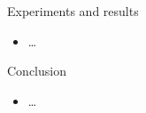\documentclass[t,11pt]{beamer}
\begin{document}
\begin{frame}[fragile]{Experiments and results}
\begin{itemize}
  \item \ldots
\end{itemize}
\end{frame}

\begin{frame}[fragile]{Conclusion}
\begin{itemize}
  \item \ldots
\end{itemize}
\end{frame}
\end{document}
